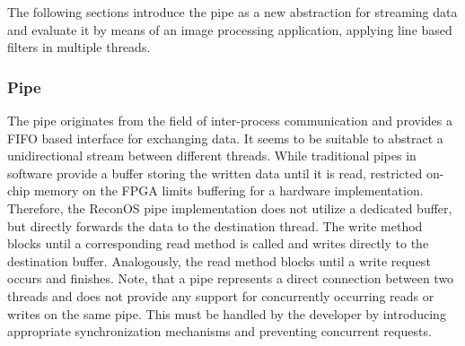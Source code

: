 The following sections introduce the pipe as a new abstraction for streaming
data and evaluate it by means of an image processing application, applying
line based filters in multiple threads.

\subsubsection{Pipe}
The pipe originates from the field of inter-process communication and provides
a \ac{FIFO} based interface for exchanging data. It seems to be suitable to
abstract a unidirectional stream between different threads. While traditional
pipes in software provide a buffer storing the written data until it is read,
restricted on-chip memory on the \ac{FPGA} limits buffering for a hardware
implementation. Therefore, the ReconOS pipe implementation does not utilize a
dedicated buffer, but directly forwards the data to the destination thread.
The write method blocks until a corresponding read method is called and writes
directly to the destination buffer. Analogously, the read method blocks until
a write request occurs and finishes. Note, that a pipe represents a direct
connection between two threads and does not provide any support for
concurrently occurring reads or writes on the same pipe. This must be handled
by the developer by introducing appropriate synchronization mechanisms and
preventing concurrent requests.

